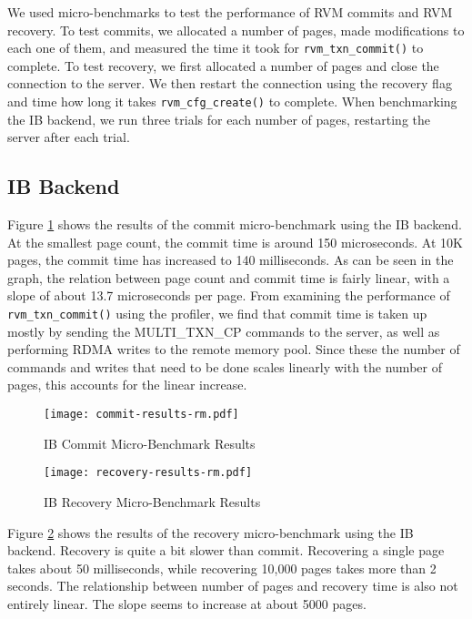 
We used micro-benchmarks to test the performance of RVM commits and RVM
recovery. To test commits, we allocated a number of pages, made modifications
to each one of them, and measured the time it took for \verb|rvm_txn_commit()|
to complete. To test recovery, we first allocated a number of pages and
close the connection to the server. We then restart the connection using the
recovery flag and time how long it takes \verb|rvm_cfg_create()| to complete.
When benchmarking the IB backend, we run three trials for each number of pages,
restarting the server after each trial.

\subsection{IB Backend}
Figure \ref{fig:ib-commit-ubm} shows the results of the commit micro-benchmark
using the IB backend. At the smallest page count, the commit time is around
150 microseconds. At 10K pages, the commit time has increased to 140 milliseconds.
As can be seen in the graph, the relation between page count and commit time
is fairly linear, with a slope of about 13.7 microseconds per page.
From examining the performance of \verb|rvm_txn_commit()| using the profiler,
we find that commit time is taken up mostly by sending the MULTI\_TXN\_CP
commands to the server, as well as performing RDMA writes to the remote memory
pool.  Since these the number of commands and writes that need to be done
scales linearly with the number of pages, this accounts for the linear
increase.

\begin{figure}[t!]
    \caption{IB Commit Micro-Benchmark Results}
    \texttt{[image: commit-results-rm.pdf]}
    \label{fig:ib-commit-ubm}
\end{figure}

\begin{figure}[t!]
    \caption{IB Recovery Micro-Benchmark Results}
    \texttt{[image: recovery-results-rm.pdf]}
    \label{fig:ib-recovery-ubm}
\end{figure}

Figure \ref{fig:ib-recovery-ubm} shows the results of the recovery
micro-benchmark using the IB backend. Recovery is quite a bit slower than
commit. Recovering a single page takes about 50 milliseconds, while recovering
10,000 pages takes more than 2 seconds. The relationship between number of
pages and recovery time is also not entirely linear. The slope seems to
increase at about 5000 pages.

